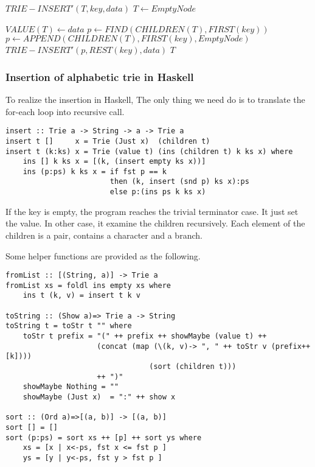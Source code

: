 \documentclass{article}
\begin{document}
\begin{algorithmic}
\STATE $TRIE-INSERT'(T, key, data)$
  \STATE $T \leftarrow EmptyNode$ \ENDIF

  \STATE $VALUE(T) \leftarrow data$
\ELSE
  \STATE $p \leftarrow FIND(CHILDREN(T), FIRST(key))$
    \STATE $p \leftarrow APPEND(CHILDREN(T), FIRST(key), EmptyNode)$
  \ENDIF
  \STATE $TRIE-INSERT'(p, REST(key), data)$
\ENDIF
\RETURN $T$
\end{algorithmic}

\subsubsection*{Insertion of alphabetic trie in Haskell}
To realize the insertion in Haskell, The only thing we need do is
to translate the for-each loop into recursive call. 

\lstset{language=Haskell}
\begin{lstlisting}
insert :: Trie a -> String -> a -> Trie a
insert t []     x = Trie (Just x)  (children t)
insert t (k:ks) x = Trie (value t) (ins (children t) k ks x) where
    ins [] k ks x = [(k, (insert empty ks x))]
    ins (p:ps) k ks x = if fst p == k 
                        then (k, insert (snd p) ks x):ps
                        else p:(ins ps k ks x)
\end{lstlisting}

If the key is empty, the program reaches the trivial terminator case.
It just set the value. In other case, it examine the children recursively.
Each element of the children is a pair, contains a character and
a branch. 

Some helper functions are provided as the following.

\begin{lstlisting}
fromList :: [(String, a)] -> Trie a
fromList xs = foldl ins empty xs where
    ins t (k, v) = insert t k v

toString :: (Show a)=> Trie a -> String
toString t = toStr t "" where
    toStr t prefix = "(" ++ prefix ++ showMaybe (value t) ++ 
                     (concat (map (\(k, v)-> ", " ++ toStr v (prefix++[k])))
                                 (sort (children t)))
                     ++ ")"
    showMaybe Nothing = ""
    showMaybe (Just x)  = ":" ++ show x

sort :: (Ord a)=>[(a, b)] -> [(a, b)]
sort [] = []
sort (p:ps) = sort xs ++ [p] ++ sort ys where
    xs = [x | x<-ps, fst x <= fst p ]
    ys = [y | y<-ps, fst y > fst p ]
\end{lstlisting}
\end{document}
